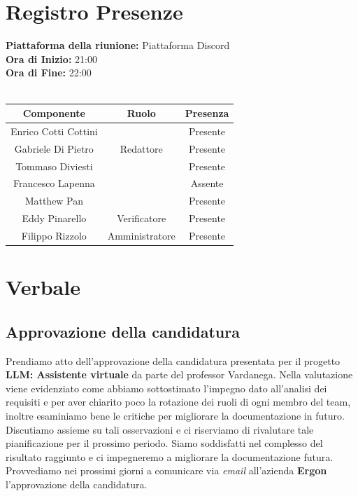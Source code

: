 \documentclass{article}
\begin{document}
\section{Registro Presenze}
\textbf{Piattaforma della riunione:} Piattaforma Discord \\
\textbf{Ora di Inizio:} 21:00\\
\textbf{Ora di Fine:} 22:00\\
\\
\begin{tabular}{|c|c|c|} %
    \hline
    \textbf{Componente} & \textbf{Ruolo} & \textbf{Presenza}\\
    \hline
    Enrico Cotti Cottini &  & Presente \\ 
    \hline
    Gabriele Di Pietro & Redattore & Presente\\ 
    \hline
    Tommaso Diviesti &  & Presente \\ 
    \hline 
    Francesco Lapenna & & Assente \\ 
    \hline
    Matthew Pan &  & Presente\\ 
    \hline 
    Eddy Pinarello & Verificatore & Presente \\ 
    \hline 
    Filippo Rizzolo & Amministratore & Presente \\ 
    \hline 
\end{tabular}

\newpage
\section{Verbale}
\subsection{Approvazione della candidatura}
Prendiamo atto dell'approvazione della candidatura presentata per il progetto \textbf{LLM: Assistente virtuale} da parte del professor Vardanega.
Nella valutazione viene evidenziato come abbiamo sottostimato l'impegno dato all'analisi dei requisiti e per aver chiarito poco la rotazione dei ruoli di ogni membro del team, inoltre esaminiamo bene le critiche per migliorare la documentazione in futuro.
Discutiamo assieme su tali osservazioni e ci riserviamo di rivalutare tale pianificazione per il prossimo periodo.
Siamo soddisfatti nel complesso del risultato raggiunto e ci impegneremo a migliorare la documentazione futura.
Provvediamo nei prossimi giorni a comunicare via \textit{email} all'azienda \textbf{Ergon} l'approvazione della candidatura.
\end{document}
